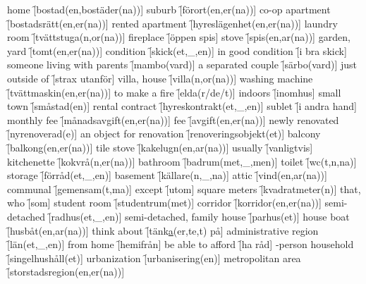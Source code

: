 \begin{questions}
    \begin{multicols}{2}
        \raggedcolumns
        \question home \f[bostad(en,bostäder(na))]
        \question suburb \f[förort(en,er(na))]
        \question co-op apartment \f[bostadsrätt(en,er(na))]
        \question rented apartment \f[hyreslägenhet(en,er(na))]
        \question laundry room \f[tvättstuga(n,or(na))]
        \question fireplace \f[öppen spis]
        \question stove \f[spis(en,ar(na))]
        \question garden, yard \f[tomt(en,er(na))]
        \question condition \f[skick(et,\_,en)]
        \question in good condition \f[i bra skick]
        \question someone living with parents \f[mambo(vard)]
        \question a separated couple \f[särbo(vard)]
        \question just outside of \f[strax utanför]
        \question villa, house \f[villa(n,or(na))]
        \question washing machine \f[tvättmaskin(en,er(na))]
        \question to make a fire \f[elda(r/de/t)]
        \question indoors \f[inomhus]
        \question small town \f[småstad(en)]
        \question rental contract \f[hyreskontrakt(et,\_,en)]
        \question sublet \f[i andra hand]
        \question monthly fee \f[månadsavgift(en,er(na))]
        \question fee \f[avgift(en,er(na))]
        \question newly renovated \f[nyrenoverad(e)]
        \question an object for renovation \f[renoveringsobjekt(et)]
        \question balcony \f[balkong(en,er(na))]
        \question tile stove \f[kakelugn(en,ar(na))]
        \question usually \f[vanligtvis]
        \question kitchenette \f[kokvrå(n,er(na))]
        \question bathroom \f[badrum(met,\_,men)]
        \question toilet \f[wc(t,n,na)]
        \question storage \f[förråd(et,\_,en)]
        \question basement \f[källare(n,\_,na)]
        \question attic \f[vind(en,ar(na))]
        \question communal \f[gemensam(t,ma)]
        \question except \f[utom]
        \question square meters \f[kvadratmeter(n)]
        \question that, who \f[som]
        \question student room \f[studentrum(met)]
        \question corridor \f[korridor(en,er(na))]
        \question semi-detached \f[radhus(et,\_,en)]
        \question semi-detached, family house \f[parhus(et)]
        \question house boat \f[husbåt(en,ar(na))]
        \question think about \f[tänk\underline{a}(er,te,t) på]
        \question administrative region \f[län(et,\_,en)]
        \question from home \f[hemifrån]
        \question be able to afford \f[ha råd]
        -person household \f[singelhushåll(et)]
        \question urbanization \f[urbanisering(en)]
        \question metropolitan area \f[storstadsregion(en,er(na))]

\end{multicols}
\end{questions}
